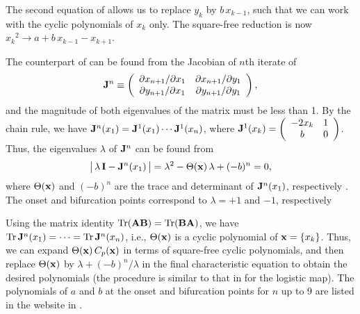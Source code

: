 \documentclass{ws-ijbc}
\begin{document}
The second equation of 
allows us to replace $y_k$ by $b \, x_{k-1}$,
  such that we can work with the cyclic polynomials of $x_k$ only.
The square-free reduction is now
  ${x_k}^2 \rightarrow a + b \, x_{k-1} - x_{k+1}$.



The counterpart of 
  can be found from the Jacobian of $n$th iterate of 
\[
  \mathbf{J}^n
  \equiv
  \left(
    \begin{array}{ccc}
      \partial x_{n+1}/\partial x_1 & \partial x_{n+1}/\partial y_1 \\
      \partial y_{n+1}/\partial x_1 & \partial y_{n+1}/\partial y_1 \\
    \end{array}
  \right),
\]
and the magnitude of both eigenvalues of the matrix must be less than 1.
By the chain rule, we have
  $\mathbf{J}^n (x_1) = \mathbf{J}^1(x_1) \cdots \mathbf{J}^1(x_n)$,
  where
$\mathbf{J}^1(x_k)
  =
  \left(
    \begin{array}{cc}
      -2 x_k & 1 \\
      b & 0
    \end{array}
  \right)$.
Thus, the eigenvalues $\lambda$ of $\mathbf{J}^n$ can be found from
%
\begin{equation}
\big|\, \lambda \, \mathbf{I} - \mathbf{J}^n(x_1) \,\big|
  = \lambda^2 - \Theta(\mathbf{x}) \,\lambda +(-b)^n = 0,
\label{eq:henonder}
\end{equation}
%
where $\Theta(\mathbf{x})$ and $(-b)^n$
  are the trace and determinant of $\mathbf{J}^n(x_1)$,
  respectively \cite{huang, hitzl}.
The onset and bifurcation points
  correspond to $\lambda = +1$ and $-1$, respectively



Using the matrix identity $\mathrm{Tr}( \mathbf{A} \mathbf{B}) = \mathrm{Tr}(\mathbf{B} \mathbf{A})$,
  we have
    $\mathrm{Tr} \, \mathbf{J}^n(x_1) = \cdots = \mathrm{Tr} \, \mathbf{J}^n(x_n)$,
i.e., $\Theta(\mathbf{x})$ is a cyclic polynomial of $\mathbf{x} = \{ x_k \}$.
%
Thus, we can expand $\Theta(\mathbf{x}) \, C_p(\mathbf{x})$
  in terms of square-free cyclic polynomials,
  and then replace $\Theta(\mathbf{x})$ by $\lambda + (-b)^n/\lambda$
  in the final characteristic equation to obtain the desired polynomials
  (the procedure is similar to that in  for the logistic map).
%
%
%
The polynomials of $a$ and $b$
  at the onset and bifurcation points for $n$ up to 9
  are listed in the website in .
\end{document}
